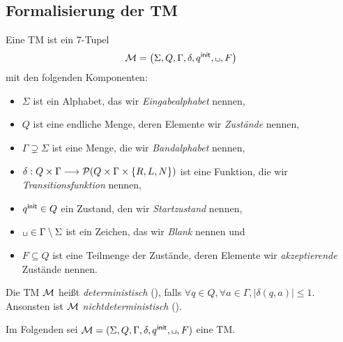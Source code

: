 \subsection{Formalisierung der \ac{TM}} %
\begin{Def}[name={[\acs*{TM}]}]\label{def:4.tm} %
	Eine \ac{TM} ist ein 7-Tupel
	\begin{equation*}
		\M=\left(\Sigma,Q,\Gamma,\delta,\qinit,\blank,F\right)
	\end{equation*}
	mit den folgenden Komponenten:
	\begin{itemize}
		\item $\Sigma$ ist ein Alphabet, das wir \emph{Eingabealphabet} nennen,
		\item $Q$ ist eine endliche Menge, deren Elemente wir \emph{Zustände} nennen,
		\item $\Gamma\supsetneq\Sigma$ ist eine Menge, die wir \emph{Bandalphabet} nennen,
		\item $\delta: Q\times\Gamma\--> \Powerset(Q\times\Gamma\times\{R,L,N\})$ ist eine Funktion, die wir \emph{Transitionsfunktion} nennen,
		\item $q^\mathsf{init}\in Q$ ein Zustand, den wir \emph{Startzustand} nennen,
		\item $\blank\in\Gamma\setminus\Sigma$ ist ein Zeichen, das wir \emph{Blank} nennen und
		\item $F\subseteq Q$ ist eine Teilmenge der Zustände, deren Elemente wir \emph{akzeptierende} Zustände nennen.
	\end{itemize}
        Die \ac{TM} $\mathcal{M}$ heißt \emph{deterministisch}
        (), falls $\forall q\in Q, \forall a\in\Gamma, |\delta
        (q,a)| \le 1$.
        Ansonsten ist $\mathcal{M}$ \emph{nichtdeterministisch} ().
\end{Def}
Im Folgenden sei $\M=(\Sigma, Q, \Gamma, \delta, \qinit, \blank, F)$ eine \ac{TM}.


